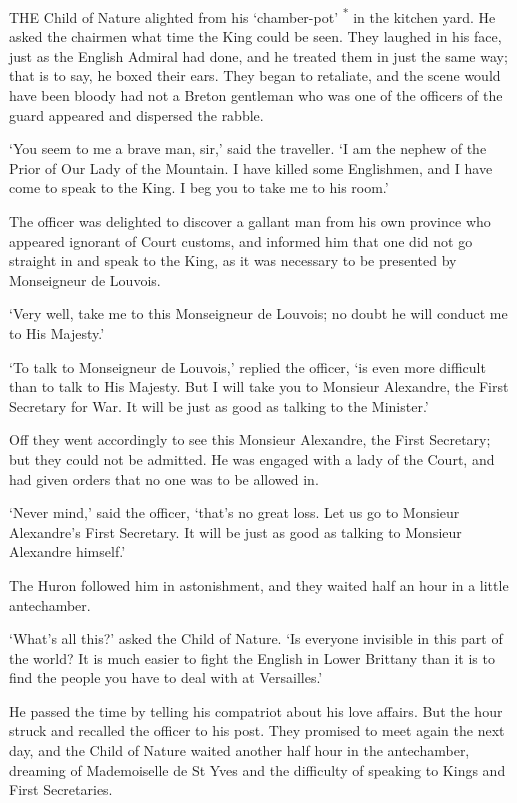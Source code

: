 \documentclass{article}
\begin{document}
\begin{center}
 

THE Child of Nature alighted from his `chamber-pot' \textsuperscript{*} in the 
kitchen yard. He asked the chairmen what time the King could be seen. They laughed 
in his face, just as the English Admiral had done, and he treated them in just 
the same way; that is to say, he boxed their ears. They began to retaliate, and 
the scene would have been bloody had not a Breton gentleman who was one of the 
officers of the guard appeared and dispersed the rabble. 

`You seem to me a brave man, sir,' said the traveller. `I am the nephew of the 
Prior of Our Lady of the Mountain. I have killed some Englishmen, and I have come 
to speak to the King. I beg you to take me to his room.' 

The officer was delighted to discover a gallant man from his own province who appeared 
ignorant of Court customs, and informed him that one did not go straight in and 
speak to the King, as it was necessary to be presented by Monseigneur de Louvois. 

`Very well, take me to this Monseigneur de Louvois; no doubt he will conduct me 
to His Majesty.' 

`To talk to Monseigneur de Louvois,' replied the officer, `is even more difficult 
than to talk to His Majesty. But I will take you to Monsieur Alexandre, the First 
Secretary for War. It will be just as good as talking to the Minister.' 

Off they went accordingly to see this Monsieur Alexandre, the First Secretary; 
but they could not be admitted. He was engaged with a lady of the Court, and had 
given orders that no one was to be allowed in. 

`Never mind,' said the officer, `that's no great loss. Let us go to Monsieur Alexandre's 
First Secretary. It will be just as good as talking to Monsieur Alexandre himself.' 

The Huron followed him in astonishment, and they waited half an hour in a little 
antechamber. 

`What's all this?' asked the Child of Nature. `Is everyone invisible in this part 
of the world? It is much easier to fight the English in Lower Brittany than it 
is to find the people you have to deal with at Versailles.' 

He passed the time by telling his compatriot about his love affairs. But the hour 
struck and recalled the officer to his post. They promised to meet again the next 
day, and the Child of Nature waited another half hour in the antechamber, dreaming 
of Mademoiselle de St Yves and the difficulty of speaking to Kings and First Secretaries. 


\end{center}
\end{document}
